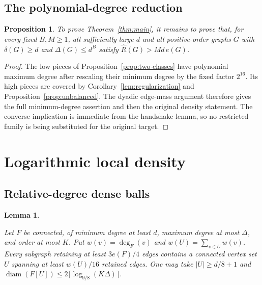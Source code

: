 \documentclass[11pt]{amsart}
\newtheorem{proposition}[theorem]{Proposition}
\newtheorem{lemma}[theorem]{Lemma}
\theoremstyle{definition}
\theoremstyle{remark}
\numberwithin{equation}{section}
\begin{document}
\subsection{The polynomial-degree reduction}

\begin{proposition}\label{prop:polynomial}
To prove Theorem~\ref{thm:main}, it remains to prove that, for every fixed
$B,M\ge1$, all sufficiently large $ d $ and all positive-order graphs $ G$
with $\delta(G)\ge d $ and $\Delta(G)\le d^B$ satisfy
$\widehat R(G)>Md\,e(G)$.
\end{proposition}
\begin{proof}
The low pieces of Proposition~\ref{prop:two-classes} have polynomial
maximum degree after rescaling their minimum degree by the fixed factor
$2^{16}$. Its high pieces are covered by Corollary~\ref{lem:regularization}
and Proposition~\ref{prop:unbalanced}. The dyadic edge-mass argument
therefore gives the full minimum-degree assertion and then the original
density statement. The converse implication is immediate from the
handshake lemma, so no restricted family is being substituted for the
original target.
\end{proof}


\section{Logarithmic local density}\label{sec:local}

\subsection{Relative-degree dense balls}

\begin{lemma}\label{lem:relative-ball}

Let $F $ be connected, of minimum degree at least $ d $, maximum degree at most $\Delta $, and order at most $ K $. Put $ w(v)=\deg_F(v)$ and $ w(U)=\sum_{v\in U}w(v)$. Every subgraph retaining at least $3e(F)/4$ edges contains a connected vertex set $ U $ spanning at least $ w(U)/16$ retained edges. One may take $|U|\ge d/8+1$ and $\operatorname{diam}(F[U])\le 2\lceil\log_{9/8}(K\Delta)\rceil$.

\end{lemma}
\end{document}
